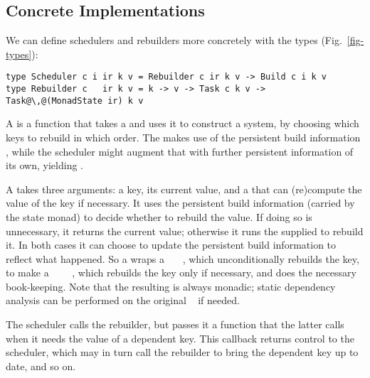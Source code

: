 \subsection{Concrete Implementations}

We can define schedulers and rebuilders more concretely with the types
(Fig.~\ref{fig-types}):

\vspace{1mm}
\begin{verbatim}
type Scheduler c i ir k v = Rebuilder c ir k v -> Build c i k v
type Rebuilder c   ir k v = k -> v -> Task c k v -> Task@\,@(MonadState ir) k v
\end{verbatim}
\vspace{1mm}

\noindent
A  is a function that takes a  and uses
it to construct a  system, by choosing which keys to rebuild in which
order. The  makes use of the persistent build information
, while the scheduler might augment that with further persistent
information of its own, yielding .

A  takes three arguments: a key, its current value, and a
 that can (re)compute the value of the key if necessary. It uses the
persistent build information  (carried by the state monad) to decide
whether to rebuild the value. If doing so is unnecessary, it returns the current
value; otherwise it runs the supplied  to rebuild it. In both cases it
can choose to update the persistent build information  to reflect what
happened. So a  wraps a ~~~, which
unconditionally rebuilds the key, to make a
~~~~, which rebuilds the key only
if necessary, and does the necessary book-keeping. Note that the resulting
 is always monadic; static dependency analysis can be performed on the
original ~ if needed.

The scheduler calls the rebuilder, but passes it a  function
that the latter calls when it needs the value of a dependent key.  This
callback returns control to the scheduler, which may in turn call the
rebuilder to bring the dependent key up to date, and so on.

